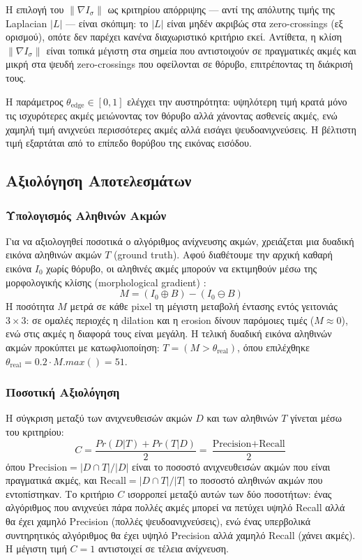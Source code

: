 \documentclass[12pt, a4paper]{article}
\begin{document}
Η επιλογή του $\|\nabla I_\sigma\|$ ως κριτηρίου απόρριψης — αντί της απόλυτης
τιμής της Laplacian $|L|$ — είναι σκόπιμη: το $|L|$ είναι μηδέν ακριβώς στα
zero-crossings (εξ ορισμού), οπότε δεν παρέχει κανένα διαχωριστικό κριτήριο
εκεί. Αντίθετα, η κλίση $\|\nabla I_\sigma\|$ είναι τοπικά μέγιστη στα σημεία
που αντιστοιχούν σε πραγματικές ακμές και μικρή στα ψευδή zero-crossings που
οφείλονται σε θόρυβο, επιτρέποντας τη διάκρισή τους.

Η παράμετρος $\theta_{\text{edge}} \in [0,1]$ ελέγχει την αυστηρότητα: υψηλότερη
τιμή κρατά μόνο τις ισχυρότερες ακμές μειώνοντας τον θόρυβο αλλά χάνοντας
ασθενείς ακμές, ενώ χαμηλή τιμή ανιχνεύει περισσότερες ακμές αλλά εισάγει
ψευδοανιχνεύσεις. Η βέλτιστη τιμή εξαρτάται από το επίπεδο θορύβου της
εικόνας εισόδου.

\subsection{Αξιολόγηση Αποτελεσμάτων}

\subsubsection{Υπολογισμός Αληθινών Ακμών}

Για να αξιολογηθεί ποσοτικά ο αλγόριθμος ανίχνευσης ακμών, χρειάζεται μια
δυαδική εικόνα αληθινών ακμών $T$ (ground truth). Αφού διαθέτουμε την αρχική
καθαρή εικόνα $I_0$ χωρίς θόρυβο, οι αληθινές ακμές μπορούν να εκτιμηθούν
μέσω της μορφολογικής κλίσης (morphological gradient) \cite{maragos2005}:
\begin{equation}
    M = (I_0 \oplus B) - (I_0 \ominus B)
\end{equation}
Η ποσότητα $M$ μετρά σε κάθε pixel τη μέγιστη μεταβολή έντασης εντός
γειτονιάς $3 \times 3$: σε ομαλές περιοχές η dilation και η erosion δίνουν
παρόμοιες τιμές ($M \approx 0$), ενώ στις ακμές η διαφορά τους είναι μεγάλη.
Η τελική δυαδική εικόνα αληθινών ακμών προκύπτει με κατωφλιοποίηση:
$T = (M > \theta_{\text{real}})$, όπου επιλέχθηκε
$\theta_{\text{real}} = 0.2 \cdot M.max() = 51$.

\subsubsection{Ποσοτική Αξιολόγηση}

Η σύγκριση μεταξύ των ανιχνευθεισών ακμών $D$ και των αληθινών $T$ γίνεται
μέσω του κριτηρίου:
\begin{equation}
    C = \frac{Pr(D|T) + Pr(T|D)}{2} = \frac{\text{Precision} + \text{Recall}}{2}
\end{equation}
όπου $\text{Precision} = |D \cap T| / |D|$ είναι το ποσοστό ανιχνευθεισών
ακμών που είναι πραγματικά ακμές, και $\text{Recall} = |D \cap T| / |T|$
το ποσοστό αληθινών ακμών που εντοπίστηκαν. Το κριτήριο $C$ ισορροπεί
μεταξύ αυτών των δύο ποσοτήτων: ένας αλγόριθμος που ανιχνεύει πάρα πολλές
ακμές μπορεί να πετύχει υψηλό Recall αλλά θα έχει χαμηλό Precision (πολλές
ψευδοανιχνεύσεις), ενώ ένας υπερβολικά συντηρητικός αλγόριθμος θα έχει υψηλό
Precision αλλά χαμηλό Recall (χάνει ακμές). Η μέγιστη τιμή $C = 1$
αντιστοιχεί σε τέλεια ανίχνευση.
\end{document}
